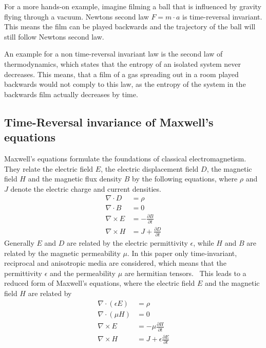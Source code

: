 For a more hands-on example, imagine filming a ball that is influenced by gravity flying through a vacuum.
Newtons second law \({F}=m \cdot {a}\) is time-reversal invariant. This means the film can be played backwards and the trajectory of the ball will still follow Newtons second law.

An example for a non time-reversal invariant law is the second law of thermodynamics, which states that the entropy of an isolated system never decreases.
This means, that a film of a gas spreading out in a room played backwards would not comply to this law, as the entropy of the system in the backwards film actually decreases by time.



\subsection{Time-Reversal invariance of Maxwell's equations}
Maxwell's equations formulate the foundations of classical electromagnetism.
They relate the electric field \(E\), the electric displacement field \(D\), the magnetic field \(H\) and the magnetic flux density \(B\)  by the following equations, where \(\rho \) and \({J}\) denote the electric charge and current densities.
\begin{align}\label{eq:maxwell}
    \nabla \cdot D &= \rho \\
    \nabla \cdot B &= 0 \\
    \nabla \times E &= -\frac{\partial B}{\partial t} \\
    \nabla \times H &= J + \frac{\partial D}{\partial t}
\end{align}
Generally \(E\) and \(D\) are related by the electric permittivity \(\epsilon \), while \(H\) and \(B\) are related by the magnetic permeability \(\mu \).
In this paper only time-invariant, reciprocal and anisotropic media are considered, which means that the permittivity \(\epsilon \) and the permeability \(\mu \) are hermitian tensors.~\parencite{krowne_electromagnetic_1984}
This leads to a reduced form of Maxwell's equations, where the electric field \(E\) and the magnetic field \(H\) are related by
\begin{align}\label{eq:maxwell_reciprocal}
    \nabla \cdot (\epsilon E) &= \rho \\
    \nabla \cdot (\mu H) &= 0 \\
    \nabla \times E &= -\mu \frac{\partial H}{\partial t} \\
    \nabla \times H &= J + \epsilon \frac{\partial E}{\partial t}
\end{align}

